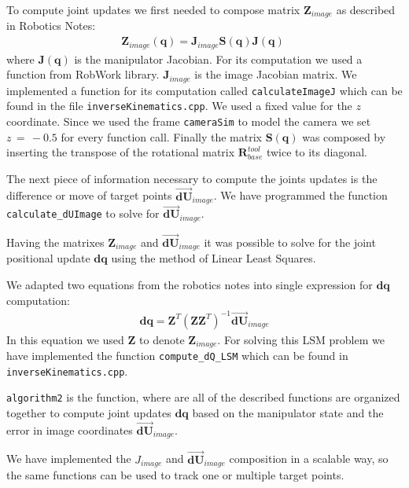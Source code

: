 \documentclass[]{scrartcl}
\begin{document}
To compute joint updates we first needed to compose matrix $\boldsymbol{Z}_{image}$ as described in Robotics Notes:
\begin{align}
	\boldsymbol{Z}_{image}(\boldsymbol{q}) = \boldsymbol{J}_{image}\boldsymbol{S}(\boldsymbol{q})\boldsymbol{J}(\boldsymbol{q})\; 
\end{align}
where $\boldsymbol{J}(\boldsymbol{q})$ is the manipulator Jacobian. For its computation we used a function from RobWork library. $\boldsymbol{J}_{image}$ is the image Jacobian matrix. We implemented a function for its computation called \texttt{calculateImageJ} which can be found in the file \texttt{inverseKinematics.cpp}. We used a fixed value for the $z$ coordinate. Since we used the frame \texttt{cameraSim} to model the camera we set $z\, = \, -0.5$ for every function call. Finally the matrix $\boldsymbol{S}(\boldsymbol{q})$ was composed by inserting the transpose of the rotational matrix $\boldsymbol{R}_{base}^{tool}$ twice to its diagonal.

The next piece of information necessary to compute the joints updates is the difference or move of target points $\overrightarrow{\boldsymbol{dU}}_{image}$. We have programmed the function \texttt{calculate\_dUImage} to solve for $\overrightarrow{\boldsymbol{dU}}_{image}$.

Having the matrixes $\boldsymbol{Z}_{image}$ and $\overrightarrow{\boldsymbol{dU}}_{image}$ it was possible to solve for the joint positional update ${\boldsymbol{dq}}$ using the method of Linear Least Squares.

We adapted two equations from the robotics notes into single expression for ${\boldsymbol{dq}}$ computation:
\begin{align}
	\boldsymbol{dq} = \boldsymbol{Z}^T\left(\boldsymbol{Z}\boldsymbol{Z}^T\right)^{-1} \overrightarrow{\boldsymbol{dU}}_{image}
\end{align}
In this equation we used $\boldsymbol{Z}$ to denote $\boldsymbol{Z}_{image}$.
For solving this LSM problem we have implemented the function \texttt{compute\_dQ\_LSM} which can be found in \texttt{inverseKinematics.cpp}.

\texttt{algorithm2} is the function, where are all of the described functions are organized together to compute joint updates $\boldsymbol{dq}$ based on the manipulator state and the error in image coordinates $\overrightarrow{\boldsymbol{dU}}_{image}$.

We have implemented the $J_{image}$ and $\overrightarrow{\boldsymbol{dU}}_{image}$ composition in a scalable way, so the same functions can be used to track one or multiple target points.
\end{document}
